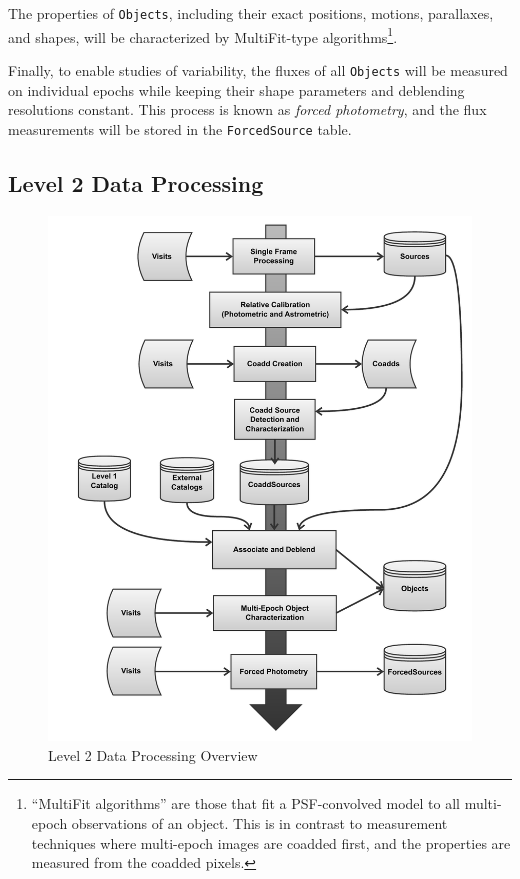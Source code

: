 \documentclass[12pt]{article}
\newcommand{\code}[1]{\texttt{#1}}
\newcommand{\Objects}{\code{Objects}\xspace}
\newcommand{\ForcedSource}{\code{ForcedSource}\xspace}
\begin{document}
The properties of \Objects, including their exact positions, motions, parallaxes, and shapes, will be characterized by MultiFit-type algorithms\footnote{``MultiFit algorithms'' are those that fit a PSF-convolved model to all multi-epoch observations of an object. This is in contrast to measurement techniques where multi-epoch images are coadded first, and the properties are measured from the coadded pixels.}.

Finally, to enable studies of variability, the fluxes of all \Objects will be measured on individual epochs while keeping their shape parameters and deblending resolutions constant. This process is known as {\em forced photometry}, and the flux measurements will be stored in the \ForcedSource table.

\subsection{Level 2 Data Processing}
\label{sec:level2dp}

\begin{figure}[!htbp]
    \centering
    \includegraphics[scale=0.5]{Level_2_Processing_Flowchart}
    \caption{Level 2 Data Processing Overview\label{fig:level2dp}}    
\end{figure}
\end{document}
